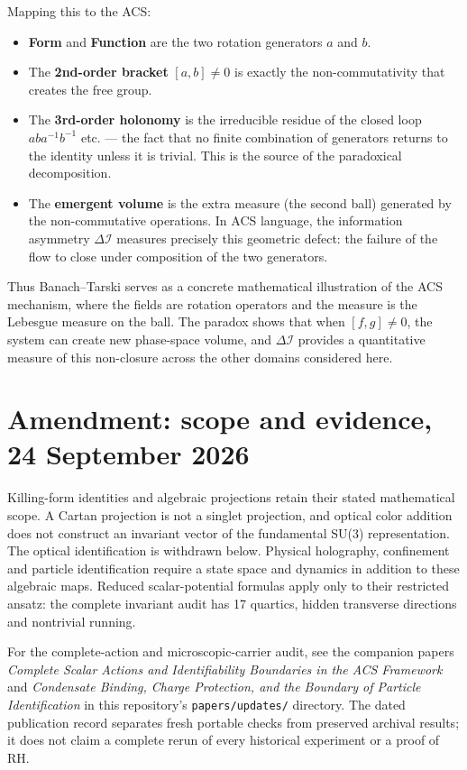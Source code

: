 \documentclass[11pt,a4paper]{article}
\theoremstyle{plain}
\theoremstyle{definition}
\theoremstyle{remark}
\newcommand{\DI}{\Delta\mathcal{I}}
\begin{document}
Mapping this to the ACS:
\begin{itemize}[noitemsep]
  \item \textbf{Form} and \textbf{Function} are the two rotation generators $a$ and $b$.
  \item The \textbf{2nd-order bracket} $[a,b] \neq 0$ is exactly the non-commutativity that
    creates the free group.
  \item The \textbf{3rd-order holonomy} is the irreducible residue of the closed loop
    $a b a^{-1} b^{-1}$ etc. --- the fact that no finite combination of generators returns
    to the identity unless it is trivial.  This is the source of the paradoxical decomposition.
  \item The \textbf{emergent volume} is the extra measure (the second ball) generated by
    the non-commutative operations.  In ACS language, the information asymmetry $\DI$
    measures precisely this geometric defect: the failure of the flow to close under
    composition of the two generators.
\end{itemize}

Thus Banach--Tarski serves as a concrete mathematical illustration of the ACS
mechanism, where the fields are rotation operators and the measure is the Lebesgue
measure on the ball.  The paradox shows that when $[f,g] \neq 0$, the system can
create new phase-space volume, and $\DI$ provides a quantitative measure of this
non-closure across the other domains considered here.



\section*{Amendment: scope and evidence, 24 September 2026}
Killing-form identities and algebraic projections retain their stated mathematical scope. A Cartan projection is not a singlet projection, and optical color addition does not construct an invariant vector of the fundamental SU(3) representation. The optical identification is withdrawn below. Physical holography, confinement and particle identification require a state space and dynamics in addition to these algebraic maps. Reduced scalar-potential formulas apply only to their restricted ansatz: the complete invariant audit has 17 quartics, hidden transverse directions and nontrivial running.

For the complete-action and microscopic-carrier audit, see the companion
papers \emph{Complete Scalar Actions and Identifiability Boundaries in the ACS
Framework} and \emph{Condensate Binding, Charge Protection, and the Boundary
of Particle Identification} in this repository's \texttt{papers/updates/}
directory. The dated publication record separates fresh portable checks
from preserved archival results; it does not claim a complete rerun of every
historical experiment or a proof of RH.
\end{document}
